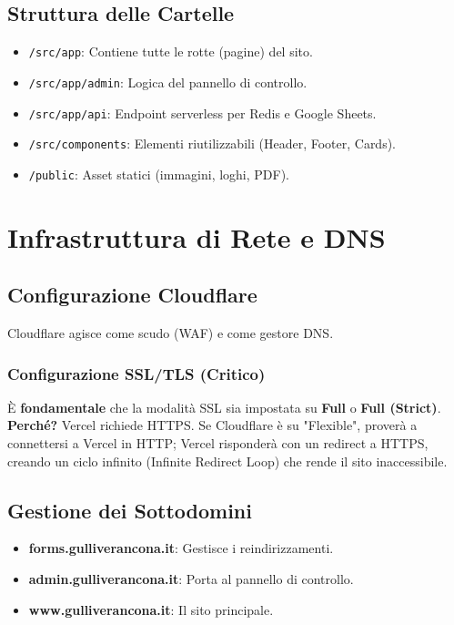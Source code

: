 \documentclass[11pt,a4paper,oneside]{book}
\begin{document}
\section{Struttura delle Cartelle}
\begin{itemize}
    \item \texttt{/src/app}: Contiene tutte le rotte (pagine) del sito.
    \item \texttt{/src/app/admin}: Logica del pannello di controllo.
    \item \texttt{/src/app/api}: Endpoint serverless per Redis e Google Sheets.
    \item \texttt{/src/components}: Elementi riutilizzabili (Header, Footer, Cards).
    \item \texttt{/public}: Asset statici (immagini, loghi, PDF).
\end{itemize}

\chapter{Infrastruttura di Rete e DNS}
\section{Configurazione Cloudflare}
Cloudflare agisce come scudo (WAF) e come gestore DNS.
\subsection{Configurazione SSL/TLS (Critico)}
È \textbf{fondamentale} che la modalità SSL sia impostata su \textbf{Full} o \textbf{Full (Strict)}. 
\textbf{Perché?} Vercel richiede HTTPS. Se Cloudflare è su "Flexible", proverà a connettersi a Vercel in HTTP; Vercel risponderà con un redirect a HTTPS, creando un ciclo infinito (Infinite Redirect Loop) che rende il sito inaccessibile.

\section{Gestione dei Sottodomini}
\begin{itemize}
    \item \textbf{forms.gulliverancona.it}: Gestisce i reindirizzamenti.
    \item \textbf{admin.gulliverancona.it}: Porta al pannello di controllo.
    \item \textbf{www.gulliverancona.it}: Il sito principale.
\end{itemize}
\end{document}
